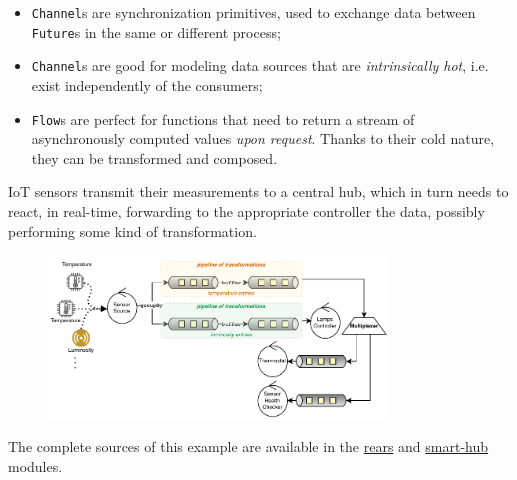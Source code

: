 \documentclass[aspectratio=1610,xcolor=dvipsnames,handout]{beamer}
\begin{document}
\begin{frame}
  \begin{block}{}
      \begin{itemize}
          \item \texttt{Channel}s are synchronization primitives, used to exchange data between \texttt{Future}s in the same or different process;
          \item \texttt{Channel}s are good for modeling data sources that are \textit{intrinsically hot}, i.e. exist independently of the consumers;
          \item \texttt{Flow}s are perfect for functions that need to return a stream of asynchronously computed values \textit{upon request}. Thanks to their cold nature, they can be transformed and composed.
      \end{itemize}
  \end{block}
\end{frame}
%
\begin{frame}
  \begin{example}[3]
    IoT sensors transmit their measurements to a central hub, which in turn needs to react, in real-time, forwarding to the appropriate controller the data, possibly performing some kind of transformation.
    \begin{figure}
      \centering
      \includegraphics[width=0.8\textwidth]{./images/iot.pdf}
    \end{figure}
  \end{example}
  \footnotesize
  The complete sources of this example are available in the \href{https://github.com/tassiLuca/direct-style-experiments/tree/master/rears/src/main/scala/io/github/tassiLuca/rears}{rears} and \href{https://github.com/tassiLuca/direct-style-experiments/tree/master/smart-hub-direct}{smart-hub} modules.
\end{frame}
%
\end{document}
